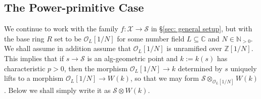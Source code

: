 \documentclass[letter, 11pt]{article}
\theoremstyle{plain}
\newtheorem{lemma}[subsubsection]{Lemma}
\theoremstyle{definition}
\newcommand{\IC}{\mathbb{C}}
\newcommand{\IN}{\mathbb{N}}
\newcommand{\IQ}{\mathbb{Q}}
\newcommand{\IZ}{\mathbb{Z}}
\newcommand{\Spec}{\mathrm{Spec}}
\newcommand\tensor{{\otimes}}
\newcommand{\<}{\langle}
\renewcommand{\>}{\rangle}
\newcommand{\sX}{\mathcal{X}}
\newcommand{\sS}{\mathcal{S}}
\newcommand{\sE}{\mathcal{E}}
\newcommand{\sO}{\mathcal{O}}
\newcommand{\Def}{\mathrm{Def}}
\begin{document}

\subsection{The Power-primitive Case} We continue to work with the family $f: \sX \to \sS$ in \S\ref{sec: general setup}, but with the base ring $R$ set to be $\sO_L[1/N]$ for some number field $L \subseteq \IC$ and $N \in \IN_{> 0}$. We shall assume in addition assume that $\sO_L[1/N]$ is unramified over $\IZ[1/N]$. This implies that if $s \to \sS$ is an alg-geometric point and $k := k(s)$ has characteristic $p > 0$, then the morphism $\sO_{L}[1/N] \to k$ determined by $s$ uniquely lifts to a morphism $\sO_{L}[1/N] \to W(k)$, so that we may form $\sS \tensor_{\sO_{L}[1/N]} W(k)$. Below we shall simply write it as $\sS \tensor W(k)$.
\end{document}
